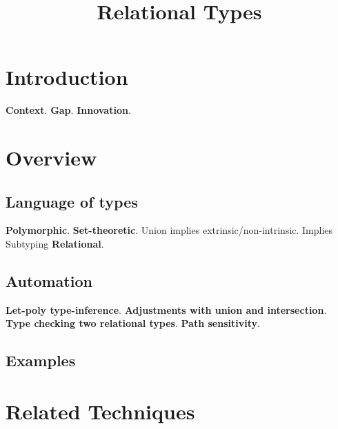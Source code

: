 \documentclass[letterpaper]{llncs}
\title{Relational Types}
\begin{document}
\maketitle


\section{Introduction}

\textbf{Context}. \newline
\textbf{Gap}. \newline
\textbf{Innovation}. \newline

\section{Overview}

\subsection{Language of types}
\textbf{Polymorphic}.  \newline
\textbf{Set-theoretic}. Union implies extrinsic/non-intrinsic. Implies Subtyping  \newline
\textbf{Relational}.  \newline

\subsection{Automation}
\textbf{Let-poly type-inference}. \newline
\textbf{Adjustments with union and intersection}. \newline
\textbf{Type checking two relational types}. \newline
\textbf{Path sensitivity}. \newline

\subsection{Examples}

\section{Related Techniques}
\end{document}
